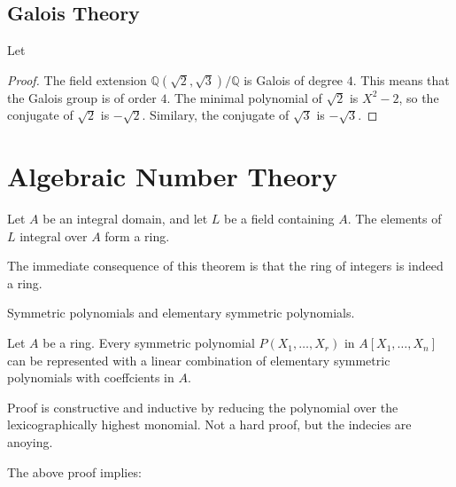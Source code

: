 \chapter{Galois Theory}

\begin{example}
    Let \(\)
\end{example}
\begin{proof}
    The field extension \(\mathbb{Q}(\sqrt{2}, \sqrt{3}) / \mathbb{Q}\) is Galois of degree \(4\). This means that the Galois group is of order \(4\). The minimal polynomial of \(\sqrt{2}\) is \(X^2 - 2\), so the conjugate of \(\sqrt{2}\) is \(-\sqrt{2}\). Similary, the conjugate of \(\sqrt{3}\) is \(-\sqrt{3}\).
\end{proof}

\part{Algebraic Number Theory}

\begin{thmbox}
    \begin{theorem}
        Let \(A\) be an integral domain, and let \(L\) be a field containing \(A\). The elements of \(L\) integral over \(A\) form a ring.
    \end{theorem}
\end{thmbox}
\begin{remark}
    The immediate consequence of this theorem is that the ring of integers is indeed a ring.
\end{remark}
\begin{defbox}
    \begin{definition}
        Symmetric polynomials and elementary symmetric polynomials.
    \end{definition}
\end{defbox}
\begin{thmbox}
    \begin{theorem}
        Let \(A\) be a ring. Every symmetric polynomial \(P(X_1, \ldots, X_r)\) in \(A[X_1, \ldots, X_n]\) can be represented with a linear combination of elementary symmetric polynomials with coeffcients in \(A\).
    \end{theorem}
\end{thmbox}
Proof is constructive and inductive by reducing the polynomial over the lexicographically highest monomial. Not a hard proof, but the indecies are anoying.

The above proof implies:

